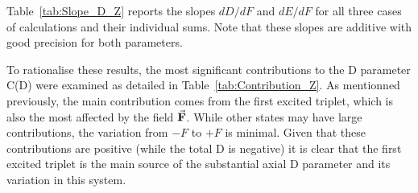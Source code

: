 \documentclass[12pt]{report}
\numberwithin{equation}{section}
\begin{document}
Table~\ref{tab:Slope_D_Z} reports the slopes $dD/dF$ and $dE/dF$ for all three cases of calculations and their individual sums.
Note that these slopes are additive with good precision for both parameters.

\begin{table}[!ht]
    \centering
	\caption{Slopes of the straight lines in cases (a), (b) and (c) for the D and E parameter for $\vec{\vb{F}}\parallel Z$, Fig.~\ref{fig:Ni_D_Z} and~\ref{fig:Ni_E_Z}}
    \label{tab:Slope_D_Z}
\end{table}

To rationalise these results, the most significant contributions to the D parameter C(D) were examined as detailed in Table~\ref{tab:Contribution_Z}.
As mentionned previously, the main contribution comes from the first excited triplet, which is also the most affected by the field $\vec{\vb F}$.
While other states may have large contributions, the variation from $-F$ to $+F$ is minimal. 
Given that these contributions are positive (while the total D is negative) it is clear that the first excited triplet is the main source of the substantial axial D parameter and its variation in this system.
\end{document}
